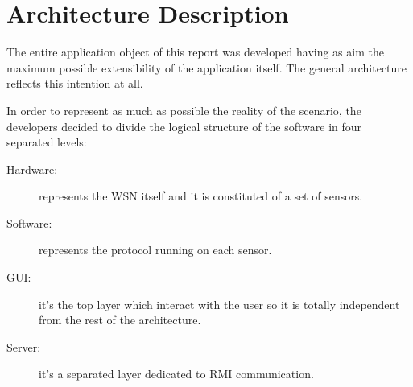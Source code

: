 \section{Architecture Description}
The entire application object of this report was developed having as aim
the maximum possible extensibility of the application itself. The general
architecture reflects this intention at all.

In order to represent as much as possible the reality of the scenario, the
developers decided to divide the logical structure of the software in four
separated levels:
\begin{description}
  \item[Hardware:] represents the WSN itself and it is constituted of a set
  of sensors.
  \item[Software:] represents the protocol running on each sensor.
  \item[GUI:] it's the top layer which interact with the user so it is totally
  independent from the rest of the architecture.
  \item[Server:] it's a separated layer dedicated to RMI communication.
\end{description}


